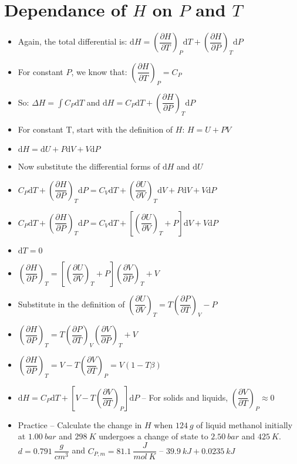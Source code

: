 \documentclass[12pt, openany, letterpaper]{memoir}
\begin{document}
\section*{Dependance of $H$ on $P$ and $T$}
\begin{itemize}
	\item Again, the total differential is: $\mathrm{d}H = \left(\dfrac{\partial H}{\partial T}\right)_P\mathrm{d}T + \left(\dfrac{\partial H}{\partial P}\right)_T \mathrm{d} P$
	\item For constant $P$, we know that: $\left(\dfrac{\partial H}{\partial T}\right)_P=C_P$
	\item So: $\Delta H = \int\!C_P\mathrm{d}T$\hspace{1em} and \hspace{1em}$\mathrm{d}H = C_P\mathrm{d}T + \left(\dfrac{\partial H}{\partial P}\right)_T\mathrm{d}P$
	\item For constant T, start with the definition of $H$: $H=U+PV$
	\item $\mathrm{d}H=\mathrm{d}U + P\mathrm{d}V + V\mathrm{d}P$
	\item Now substitute the differential forms of $\mathrm{d}H$ and $\mathrm{d}U$
	\item $C_P\mathrm{d}T + \left(\dfrac{\partial H}{\partial P}\right)_T\mathrm{d}P = C_V\mathrm{d}T + \left(\dfrac{\partial U}{\partial V}\right)_T\mathrm{d}V + P\mathrm{d}V+V\mathrm{d}P$
	\item $C_P\mathrm{d}T + \left(\dfrac{\partial H}{\partial P}\right)_T\mathrm{d}P = C_V\mathrm{d}T + \left[\left(\dfrac{\partial U}{\partial V}\right)_T + P\right]\mathrm{d}V + V\mathrm{d}P$
	\item $\mathrm{d}T = 0$
	\item $\left(\dfrac{\partial H}{\partial P}\right)_T = \left[\left(\dfrac{\partial U}{\partial V}\right)_T + P\right]\left(\dfrac{\partial V}{\partial P}\right)_T + V$
	\item Substitute in the definition of $\left(\dfrac{\partial U}{\partial V}\right)_T = T\left(\dfrac{\partial P}{\partial T}\right)_V-P$
	\item $\left(\dfrac{\partial H}{\partial P}\right)_T = T\left(\dfrac{\partial P}{\partial T}\right)_V\left(\dfrac{\partial V}{\partial P}\right)_T + V$
	\item $\left(\dfrac{\partial H}{\partial P}\right)_T = V - T\left(\dfrac{\partial V}{\partial T}\right)_P = V\left(1-T\beta\right)$
	\item $\mathrm{d}H = C_P\mathrm{d}T + \left[V-T\left(\dfrac{\partial V}{\partial T}\right)_P\right]\mathrm{d}P$ -- For solids and liquids, $\left(\dfrac{\partial V}{\partial T}\right)_P \approx 0$
	\item Practice -- Calculate the change in $H$ when $124~g$ of liquid methanol initially at $1.00~bar$ and $298~K$ undergoes a change of state to $2.50~bar$ and $425~K$. $d=0.791~\dfrac{g}{cm^3}$ and $C_{P,m}=81.1~\dfrac{J}{mol~K}$ -- $39.9~kJ + 0.0235~kJ$
\end{itemize}
\end{document}
